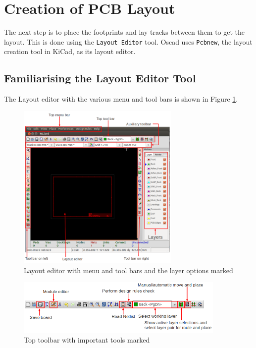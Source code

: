 \section{Creation of PCB Layout}
The next step is to place the footprints and lay tracks between them to get the layout. This is done using the {\tt Layout Editor} tool. Oscad uses {\tt Pcbnew}, the layout creation tool in KiCad, as its layout editor.
\subsection{Familiarising the Layout Editor Tool}
The Layout editor with the various menu and tool bars is shown in Figure \ref{pcbnew}.
\begin{figure}
\centering
\includegraphics[width=0.7\textwidth]{figures/pcbnew}
\caption{Layout editor with menu and tool bars and the layer options marked}
\label{pcbnew}
\end{figure}
\begin{figure}
\centering
\includegraphics[width=0.9\textwidth]{figures/toptble}
\caption{Top toolbar with important tools marked}
\label{toptble}
\end{figure}
